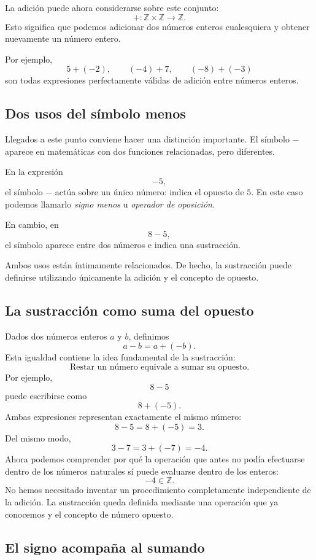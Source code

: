 La adición puede ahora considerarse sobre este conjunto:
\[
+\colon\mathbb{Z}\times\mathbb{Z}\to\mathbb{Z}.
\]
Esto significa que podemos adicionar dos números enteros cualesquiera y obtener nuevamente un número entero.

Por ejemplo,
\[
5+(-2),\qquad
(-4)+7,\qquad
(-8)+(-3)
\]
son todas expresiones perfectamente válidas de adición entre números enteros.

\subsection{Dos usos del símbolo menos}

Llegados a este punto conviene hacer una distinción importante. El símbolo \(-\) aparece en matemáticas con dos funciones relacionadas, pero diferentes.

En la expresión
\[
-5,
\]
el símbolo \(-\) actúa sobre un único número: indica el opuesto de \(5\). En este caso podemos llamarlo \emph{signo menos} u \emph{operador de oposición}.

En cambio, en
\[
8-5,
\]
el símbolo aparece entre dos números e indica una sustracción.

Ambos usos están íntimamente relacionados. De hecho, la sustracción puede definirse utilizando únicamente la adición y el concepto de opuesto.

\subsection{La sustracción como suma del opuesto}

Dados dos números enteros \(a\) y \(b\), definimos
\[
a-b=a+(-b).
\]
Esta igualdad contiene la idea fundamental de la sustracción:
\[
\boxed{\text{Restar un número equivale a sumar su opuesto.}}
\]
Por ejemplo,
\[
8-5
\]
puede escribirse como
\[
8+(-5).
\]
Ambas expresiones representan exactamente el mismo número:
\[
8-5=8+(-5)=3.
\]
Del mismo modo,
\[
3-7=3+(-7)=-4.
\]
Ahora podemos comprender por qué la operación que antes no podía efectuarse dentro de los números naturales sí puede evaluarse dentro de los enteros:
\[
-4\in\mathbb{Z}.
\]
No hemos necesitado inventar un procedimiento completamente independiente de la adición. La sustracción queda definida mediante una operación que ya conocemos y el concepto de número opuesto.

\subsection{El signo acompaña al sumando}

